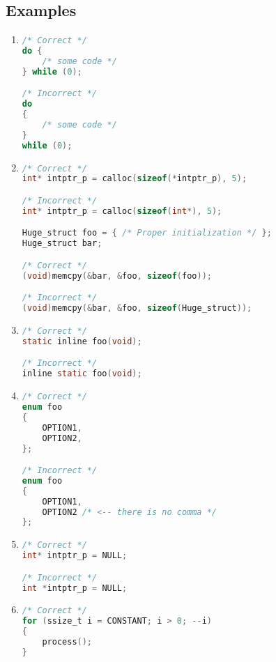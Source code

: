 \subsection{Examples}
\begin{enumerate}
    \item
\begin{lstlisting}[language=C,style=C99]
/* Correct */
do {
    /* some code */
} while (0);

/* Incorrect */
do
{
    /* some code */
}
while (0);
\end{lstlisting}

    \item 
\begin{lstlisting}[language=C,style=C99]
/* Correct */
int* intptr_p = calloc(sizeof(*intptr_p), 5);

/* Incorrect */
int* intptr_p = calloc(sizeof(int*), 5);

Huge_struct foo = { /* Proper initialization */ };
Huge_struct bar;

/* Correct */
(void)memcpy(&bar, &foo, sizeof(foo));

/* Incorrect */
(void)memcpy(&bar, &foo, sizeof(Huge_struct));
\end{lstlisting}
    
    \item 
\begin{lstlisting}[language=C,style=C99]
/* Correct */
static inline foo(void);

/* Incorrect */
inline static foo(void);
\end{lstlisting}
    
    \item 
\begin{lstlisting}[language=C,style=C99]
/* Correct */
enum foo
{
    OPTION1,
    OPTION2,
};

/* Incorrect */
enum foo
{
    OPTION1,
    OPTION2 /* <-- there is no comma */
};
\end{lstlisting}   
    
    \item 
\begin{lstlisting}[language=C,style=C99]
/* Correct */
int* intptr_p = NULL;

/* Incorrect */
int *intptr_p = NULL;
\end{lstlisting}

    \item
\begin{lstlisting}[language=C,style=C99]
/* Correct */
for (ssize_t i = CONSTANT; i > 0; --i)
{
    process();
}


\end{lstlisting}
\end{enumerate}

